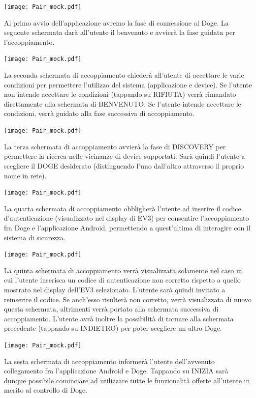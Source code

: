 \documentclass{article}
\begin{document}
\begin{center}
\texttt{[image: Pair\_mock.pdf]}
\end{center}
Al primo avvio dell'applicazione avremo la fase di connessione al Doge. La seguente schermata darà all'utente il benvenuto e avvierà la fase guidata per l'accoppiamento.

\begin{center}
\texttt{[image: Pair\_mock.pdf]}
\end{center}
La seconda schermata di accoppiamento chiederà all'utente di accettare le varie condizioni per permettere l'utilizzo del sistema (applicazione e device). Se l'utente non intende accettare le condizioni (tappando su RIFIUTA) verrà rimandato direttamente alla schermata di BENVENUTO. Se l'utente intende accettare le condizioni, verrà guidato alla fase successiva di accoppiamento.

\begin{center}
\texttt{[image: Pair\_mock.pdf]}
\end{center}
La terza schermata di accoppiamento avvierà la fase di DISCOVERY per permettere la ricerca nelle vicinanze di device supportati. Sarà quindi l'utente a scegliere il DOGE desiderato (distinguendo l'uno dall'altro attraverso il proprio nome in rete).

\begin{center}
\texttt{[image: Pair\_mock.pdf]}
\end{center}
La quarta schermata di accoppiamento obbligherà l'utente ad inserire il codice d'autenticazione (visualizzato nel display di EV3) per consentire l'accoppiamento fra Doge e l'applicazione Android, permettendo a quest'ultima di interagire con il sistema di sicurezza.

\begin{center}
\texttt{[image: Pair\_mock.pdf]}
\end{center}
La quinta schermata di accoppiamento verrà visualizzata solamente nel caso in cui l'utente inserisca un codice di autenticazione non corretto rispetto a quello mostrato nel display dell'EV3 selezionato. L'utente sarà quindi invitato a reinserire il codice. Se anch'esso risulterà non corretto, verrà visualizzata di nuovo questa schermata, altrimenti verrà portato alla schermata successiva di accoppiamento. L'utente avrà inoltre la possibilità di tornare alla schermata precedente (tappando su INDIETRO) per poter scegliere un altro Doge.

\begin{center}
\texttt{[image: Pair\_mock.pdf]}
\end{center}
La sesta schermata di accoppiamento informerà l'utente dell'avvenuto collegamento fra l'applicazione Android e Doge. Tappando su INIZIA sarà dunque possibile cominciare ad utilizzare tutte le funzionalità offerte all'utente in merito al controllo di Doge.
\end{document}
